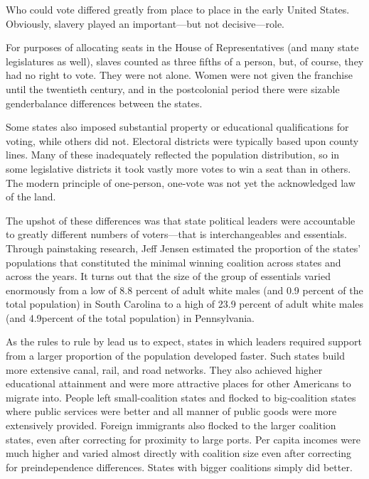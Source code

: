 \documentclass[10pt]{article}
\begin{document}
{\large Who could vote differed greatly from place to place in the early United
States. Obviously, slavery played an important---but not decisive---role.}

{\large For purposes of allocating seats in the House of Representatives (and
many state legislatures as well), slaves counted as three fifths of a person,
but, of course, they had no right to vote. They were not alone. Women were not
given the franchise until the twentieth century, and in the postcolonial period
there were sizable genderbalance differences between the states.}

{\large Some states also imposed substantial property or educational
qualifications for voting, while others did not. Electoral districts were
typically based upon county lines. Many of these inadequately reflected the
population distribution, so in some legislative districts it took vastly more
votes to win a seat than in others. The modern principle of one-person, one-vote
was not yet the acknowledged law of the land.}

{\large The upshot of these differences was that state political leaders were
accountable to greatly different numbers of voters---that is interchangeables and
essentials. Through painstaking research, Jeff Jensen estimated the proportion of
the states' populations that constituted the minimal winning coalition across
states and across the years. It turns out that the size of the group of
essentials varied enormously from a low of 8.8 percent of adult white males (and
0.9 percent of the total population) in South Carolina to a high of 23.9 percent
of adult white males (and 4.9percent of the total population) in Pennsylvania.}

{\large As the rules to rule by lead us to expect, states in which leaders
required support from a larger proportion of the population developed faster.
Such states build more extensive canal, rail, and road networks. They also
achieved higher educational attainment and were more attractive places for other
Americans to migrate into. People left small-coalition states and flocked to
big-coalition states where public services were better and all manner of public
goods were more extensively provided. Foreign immigrants also flocked to the
larger coalition states, even after correcting for proximity to large ports. Per
capita incomes were much higher and varied almost directly with coalition size
even after correcting for preindependence differences. States with bigger
coalitions simply did better.}
\end{document}
